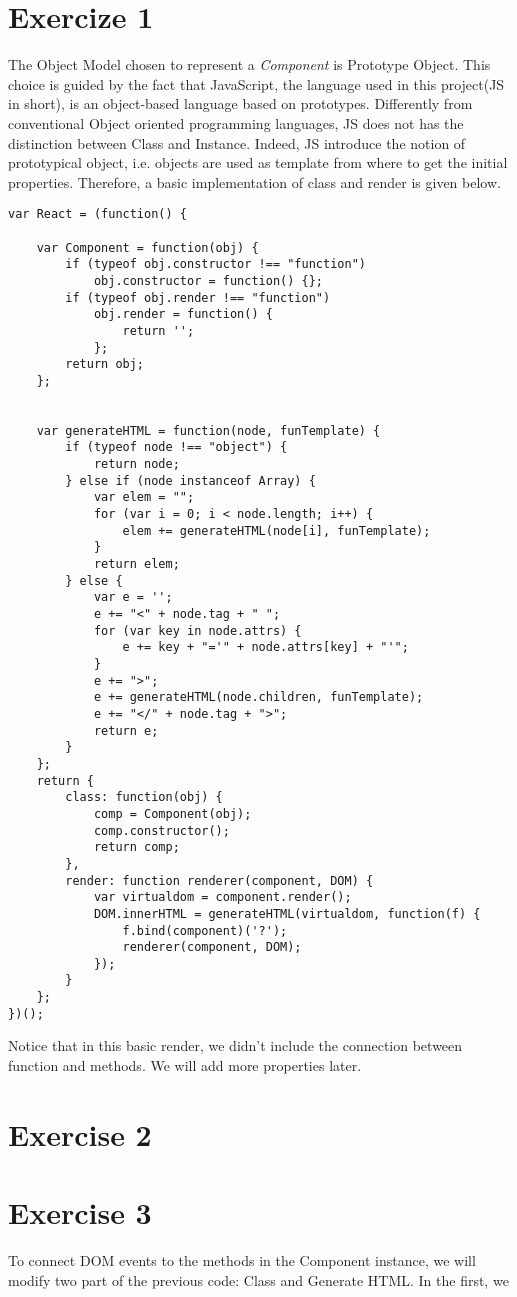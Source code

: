 \documentclass[10pt]{article}
\begin{document}
\section*{Exercize 1}
The Object Model chosen to represent a \textit{Component} is Prototype Object. This choice is guided by the fact that JavaScript, the language used in this project(JS in short), is an object-based language based on prototypes. Differently from conventional Object oriented programming languages, JS does not has the distinction between Class and Instance. Indeed, JS introduce the notion of prototypical object, i.e. objects are used as template from where to get the initial properties. Therefore, a basic implementation of class and render is given below.  
\begin{lstlisting}[caption=Simplest definition of react component and a basic render method]
var React = (function() {

    var Component = function(obj) {
        if (typeof obj.constructor !== "function")
            obj.constructor = function() {};
        if (typeof obj.render !== "function")
            obj.render = function() {
                return '';
            };
        return obj;
    };


    var generateHTML = function(node, funTemplate) {
        if (typeof node !== "object") {
            return node;
        } else if (node instanceof Array) {
            var elem = "";
            for (var i = 0; i < node.length; i++) {
                elem += generateHTML(node[i], funTemplate);
            }
            return elem;
        } else {
            var e = '';
            e += "<" + node.tag + " ";
            for (var key in node.attrs) {
                e += key + "='" + node.attrs[key] + "'";
            }
            e += ">";
            e += generateHTML(node.children, funTemplate);
            e += "</" + node.tag + ">";
            return e;
        }
    };
    return {
        class: function(obj) {
            comp = Component(obj);
            comp.constructor();
            return comp;
        },
        render: function renderer(component, DOM) {
            var virtualdom = component.render();
            DOM.innerHTML = generateHTML(virtualdom, function(f) {
                f.bind(component)('?');
                renderer(component, DOM);
            });
        }
    };
})();
\end{lstlisting}
Notice that in this basic render, we didn't include the connection between function and methods. We will add more properties later. 
\section*{Exercise 2}
\section*{Exercise 3}
To connect DOM events to the methods in the Component instance, we will modify two part of the previous code: Class and Generate HTML. In the first, we 
\end{document}
